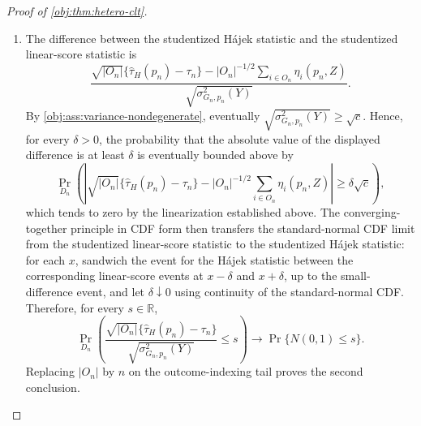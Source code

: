 \documentclass[11pt]{article}
\begin{document}
\begin{proof}[Proof of \cref{obj:thm:hetero-clt}]
\begin{enumerate}
\item The difference between the studentized Hájek statistic and the studentized linear-score statistic is
\[
\frac{
\sqrt{|O_n|}\{\widehat\tau_H(p_n)-\tau_n\}
-|O_n|^{-1/2}\sum_{i\in O_n}\eta_i(p_n,Z)}
{\sqrt{\sigma^2_{G_n,p_n}(Y)}}.
\]
By \cref{obj:ass:variance-nondegenerate}, eventually \(\sqrt{\sigma^2_{G_n,p_n}(Y)}\ge\sqrt c\).  Hence, for every \(\delta>0\), the probability that the absolute value of the displayed difference is at least \(\delta\) is eventually bounded above by
\[
\Pr_{D_n}\!\left(
\left|
\sqrt{|O_n|}\{\widehat\tau_H(p_n)-\tau_n\}
-|O_n|^{-1/2}\sum_{i\in O_n}\eta_i(p_n,Z)
\right|
\ge\delta\sqrt c
\right),
\]
which tends to zero by the linearization established above.  The converging-together principle in CDF form then transfers the standard-normal CDF limit from the studentized linear-score statistic to the studentized Hájek statistic: for each \(x\), sandwich the event for the Hájek statistic between the corresponding linear-score events at \(x-\delta\) and \(x+\delta\), up to the small-difference event, and let \(\delta\downarrow0\) using continuity of the standard-normal CDF.  Therefore, for every \(s\in\mathbb R\),
\[
\Pr_{D_n}\!\left(
\frac{\sqrt{|O_n|}\{\widehat\tau_H(p_n)-\tau_n\}}
{\sqrt{\sigma^2_{G_n,p_n}(Y)}}\le s
\right)
\longrightarrow\Pr\{N(0,1)\le s\}.
\]
Replacing \(|O_n|\) by \(n\) on the outcome-indexing tail proves the second conclusion.
\end{enumerate}
\end{proof}
\end{document}
